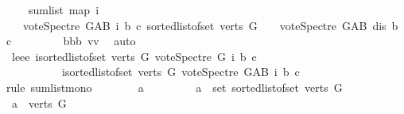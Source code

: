 \begin{isabellebody}
\ \ \ \ sum{\isacharunderscore}{\kern0pt}list\ {\isacharparenleft}{\kern0pt}map\ {\isacharparenleft}{\kern0pt}{\isasymlambda}i{\isachardot}{\kern0pt}\isanewline
\ \ \ {\isacharparenleft}{\kern0pt}vote{\isacharunderscore}{\kern0pt}Spectre\ G{\isacharunderscore}{\kern0pt}AB\ i\ b\ c{\isacharparenright}{\kern0pt}{\isacharparenright}{\kern0pt}\ {\isacharparenleft}{\kern0pt}sorted{\isacharunderscore}{\kern0pt}list{\isacharunderscore}{\kern0pt}of{\isacharunderscore}{\kern0pt}set\ {\isacharparenleft}{\kern0pt}verts\ G{\isacharparenright}{\kern0pt}{\isacharparenright}{\kern0pt}{\isacharparenright}{\kern0pt}\ {\isacharplus}{\kern0pt}\ {}\ {\isacharplus}{\kern0pt}\ vote{\isacharunderscore}{\kern0pt}Spectre\ G{\isacharunderscore}{\kern0pt}AB\ dis\ b\ c{\isachardoublequoteclose}\ \isanewline
\ \ \ \ \ \ \isamarkupfalse%
\ bbb\ vv\ \isamarkupfalse%
\ auto\isanewline
\ \ \ \ \isamarkupfalse%
\ leee{\isacharcolon}{\kern0pt}\ {\isachardoublequoteopen}{\isacharparenleft}{\kern0pt}{\isasymSum}i{\isasymleftarrow}sorted{\isacharunderscore}{\kern0pt}list{\isacharunderscore}{\kern0pt}of{\isacharunderscore}{\kern0pt}set\ {\isacharparenleft}{\kern0pt}verts\ G{\isacharparenright}{\kern0pt}{\isachardot}{\kern0pt}\ vote{\isacharunderscore}{\kern0pt}Spectre\ G\ i\ b\ c{\isacharparenright}{\kern0pt}\ {\isasymle}\isanewline
\ \ \ \ \ \ \ \ \ \ {\isacharparenleft}{\kern0pt}{\isasymSum}i{\isasymleftarrow}sorted{\isacharunderscore}{\kern0pt}list{\isacharunderscore}{\kern0pt}of{\isacharunderscore}{\kern0pt}set\ {\isacharparenleft}{\kern0pt}verts\ G{\isacharparenright}{\kern0pt}{\isachardot}{\kern0pt}\ vote{\isacharunderscore}{\kern0pt}Spectre\ G{\isacharunderscore}{\kern0pt}AB\ i\ b\ c{\isacharparenright}{\kern0pt}{\isachardoublequoteclose}\isanewline
\ \ \ \ \isamarkupfalse%
{\isacharparenleft}{\kern0pt}rule\ sum{\isacharunderscore}{\kern0pt}list{\isacharunderscore}{\kern0pt}mono{\isacharparenright}{\kern0pt}\isanewline
\ \ \ \ \ \ \isamarkupfalse%
\ a\ \isanewline
\ \ \ \ \ \ \isamarkupfalse%
\ {\isachardoublequoteopen}a\ {\isasymin}\ set\ {\isacharparenleft}{\kern0pt}sorted{\isacharunderscore}{\kern0pt}list{\isacharunderscore}{\kern0pt}of{\isacharunderscore}{\kern0pt}set\ {\isacharparenleft}{\kern0pt}verts\ G{\isacharparenright}{\kern0pt}{\isacharparenright}{\kern0pt}{\isachardoublequoteclose}\isanewline
\ \ \ \ \ \ \isamarkupfalse%
\ \isamarkupfalse%
\ {\isachardoublequoteopen}a\ {\isasymin}\ verts\ G{\isachardoublequoteclose}\ \isamarkupfalse%

\end{isabellebody}
